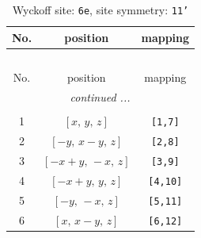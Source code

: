 \documentclass[fleqn,8pt]{jsarticle}
\begin{document}
\begin{longtable}{ccc}
\caption{Wyckoff site: {\tt 6e}, site symmetry: {\tt 11'}}
 \\
 \hline \hline
No. & position & mapping \\ \hline \endfirsthead

\multicolumn{2}{l}{\tablename\ \thetable{}} \\
 \hline \hline
No. & position & mapping \\ \hline \endhead

 \hline \hline
\multicolumn{2}{r}{\footnotesize\it continued ...} \\ \endfoot

 \hline \hline
\multicolumn{2}{r}{} \\ \endlastfoot

1 & $\left[ x,\, y,\, z \right]$ & {\tt [1,7]} \\ \hline
2 & $\left[ - y,\, x - y,\, z \right]$ & {\tt [2,8]} \\ \hline
3 & $\left[ - x + y,\, - x,\, z \right]$ & {\tt [3,9]} \\ \hline
4 & $\left[ - x + y,\, y,\, z \right]$ & {\tt [4,10]} \\ \hline
5 & $\left[ - y,\, - x,\, z \right]$ & {\tt [5,11]} \\ \hline
6 & $\left[ x,\, x - y,\, z \right]$ & {\tt [6,12]} \\
\end{longtable}
\end{document}
